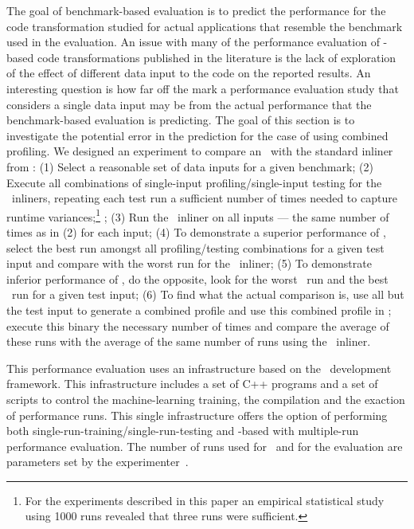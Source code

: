 
The goal of benchmark-based evaluation is to predict the performance for the code transformation studied for actual applications that resemble the benchmark used in the evaluation. An issue with many of the performance evaluation of \FDO-based code transformations published in the literature is the lack of exploration of the effect of different data input to the code on the reported results. An interesting question is how far off the mark a performance evaluation study that considers a single data input may be from the actual performance that the benchmark-based evaluation is predicting. The goal of this section is to investigate the potential error in the prediction for the case of \FDI using combined profiling. We designed an experiment to compare an \FDI\ with the standard inliner from \llvm: (1) Select a reasonable set of data inputs for a given benchmark; (2) Execute all combinations of single-input profiling/single-input testing for the \FDO\ inliners, repeating each test run a sufficient number of times needed to capture runtime variances;\footnote{For the experiments described in this paper an empirical statistical study using 1000 runs revealed that three runs were sufficient.} ; (3) Run the \llvm\ inliner on all inputs --- the same number of times as in (2) for each input; (4) To demonstrate a superior performance of \FDI, select the best run amongst all profiling/testing combinations for a given test input and compare with the worst run for the \llvm\ inliner; (5) To demonstrate inferior performance of \FDI, do the opposite, look for the worst \FDI\ run and the best \llvm\ run for a given test input; (6) To find what the actual comparison is, use all but the test input to generate a combined profile and use this combined profile in \FDI; execute this binary the necessary number of times and compare the average of these runs with the average of the same number of runs using the \llvm\ inliner.


This performance evaluation uses an infrastructure based on the \llvm\ development framework. This infrastructure includes a set of C++ programs and a set of scripts to control the machine-learning training, the compilation and the exaction of performance runs. This single infrastructure offers the option of performing both single-run-training/single-run-testing \FDO and  \CP-based \FDO with multiple-run performance evaluation. The number of runs used for \CP\ and for the evaluation are parameters set by the experimenter~\cite{BerubePhD}.

